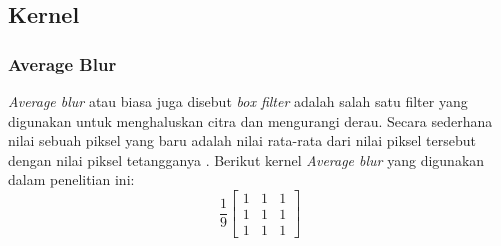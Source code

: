 




\subsection{Kernel}

\subsubsection{Average Blur}
\textit{Average blur} atau biasa juga disebut \textit{box filter} adalah salah satu filter yang digunakan untuk menghaluskan citra dan mengurangi derau. Secara sederhana nilai sebuah piksel yang baru adalah nilai rata-rata dari nilai piksel tersebut dengan nilai piksel tetangganya \cite{pdf:marcin}. Berikut kernel \textit{Average blur} yang digunakan dalam penelitian ini:
\begin{equation}
    \label{kernel:average}
    \frac{1}{9} \left[
    \begin{matrix}
 1 & 1 & 1 \\
 1 & 1 & 1 \\
 1 & 1 & 1
    \end{matrix}
    \right]
\end{equation}

